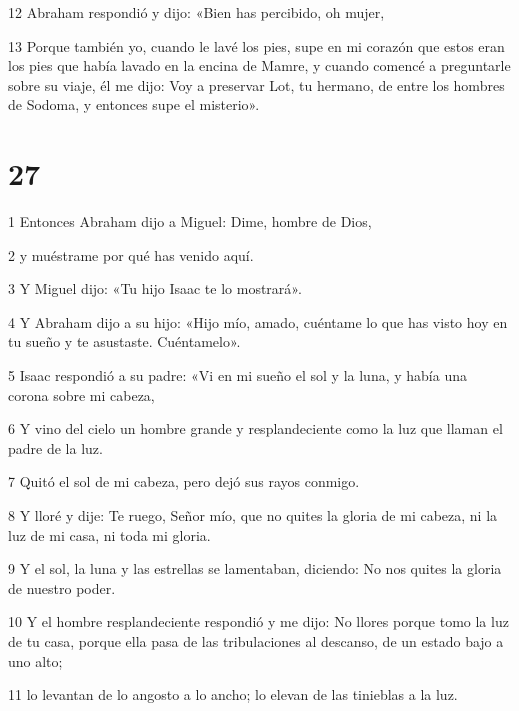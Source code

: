 \par 12 Abraham respondió y dijo: «Bien has percibido, oh mujer,

\par 13 Porque también yo, cuando le lavé los pies, supe en mi corazón que estos eran los pies que había lavado en la encina de Mamre, y cuando comencé a preguntarle sobre su viaje, él me dijo: Voy a preservar Lot, tu hermano, de entre los hombres de Sodoma, y ​​entonces supe el misterio».


\chapter{27}

\par 1 Entonces Abraham dijo a Miguel: Dime, hombre de Dios,

\par 2 y muéstrame por qué has venido aquí.

\par 3 Y Miguel dijo: «Tu hijo Isaac te lo mostrará».

\par 4 Y Abraham dijo a su hijo: «Hijo mío, amado, cuéntame lo que has visto hoy en tu sueño y te asustaste. Cuéntamelo».

\par 5 Isaac respondió a su padre: «Vi en mi sueño el sol y la luna, y había una corona sobre mi cabeza,

\par 6 Y vino del cielo un hombre grande y resplandeciente como la luz que llaman el padre de la luz.

\par 7 Quitó el sol de mi cabeza, pero dejó sus rayos conmigo.

\par 8 Y lloré y dije: Te ruego, Señor mío, que no quites la gloria de mi cabeza, ni la luz de mi casa, ni toda mi gloria.

\par 9 Y el sol, la luna y las estrellas se lamentaban, diciendo: No nos quites la gloria de nuestro poder.

\par 10 Y el hombre resplandeciente respondió y me dijo: No llores porque tomo la luz de tu casa, porque ella pasa de las tribulaciones al descanso, de un estado bajo a uno alto;

\par 11 lo levantan de lo angosto a lo ancho; lo elevan de las tinieblas a la luz.

